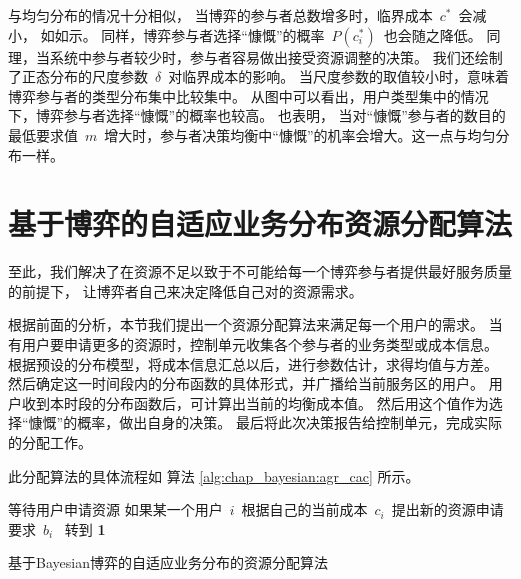 与均匀分布的情况十分相似，
当博弈的参与者总数增多时，临界成本~$c^*$~会减小， 如如示。
同样，博弈参与者选择“慷慨”的概率~$P(c_i^*)$~也会随之降低。
同理，当系统中参与者较少时，参与者容易做出接受资源调整的决策。
我们还绘制了正态分布的尺度参数~$\delta$~对临界成本的影响。
当尺度参数的取值较小时，意味着博弈参与者的类型分布集中比较集中。
从图中可以看出，用户类型集中的情况下，博弈参与者选择“慷慨”的概率也较高。
也表明，
当对“慷慨”参与者的数目的最低要求值~$m$~增大时，参与者决策均衡中“慷慨”的机率会增大。这一点与均匀分布一样。

\section{基于博弈的自适应业务分布资源分配算法}
至此，我们解决了在资源不足以致于不可能给每一个博弈参与者提供最好服务质量的前提下，
让博弈者自己来决定降低自己对的资源需求。

根据前面的分析，本节我们提出一个资源分配算法来满足每一个用户的需求。
当有用户要申请更多的资源时，控制单元收集各个参与者的业务类型或成本信息。
根据预设的分布模型，将成本信息汇总以后，进行参数估计，求得均值与方差。
然后确定这一时间段内的分布函数的具体形式，并广播给当前服务区的用户。
用户收到本时段的分布函数后，可计算出当前的均衡成本值。
然后用这个值作为选择“慷慨”的概率，做出自身的决策。
最后将此次决策报告给控制单元，完成实际的分配工作。

此分配算法的具体流程如 算法 \ref{alg:chap_bayesian:agr_cac} 所示。
\begin{algorithm}[!htbp]
\SetAlgoLined
等待用户申请资源 \;
如果某一个用户~$i$~根据自己的当前成本~$c_i$~提出新的资源申请要求~$b_i$~ \;
    转到 \bf 1\;
\caption{基于Bayesian博弈的自适应业务分布的资源分配算法} 
\label{alg:chap_bayesian:agr_cac}
\end{algorithm}

